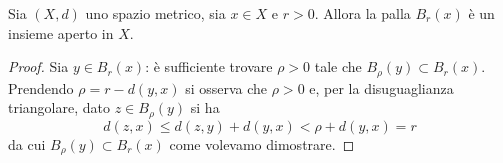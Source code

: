 \begin{theorem}
Sia $(X,d)$ uno spazio metrico, sia $x\in X$ e $r>0$. Allora la palla $B_r(x)$ è un insieme aperto in $X$.
\end{theorem}
%
\begin{proof}
Sia $y\in B_r(x)$: è sufficiente trovare $\rho>0$ tale che $B_\rho(y) \subset B_r(x)$. Prendendo $\rho = r-d(y,x)$ si osserva che $\rho >0 $ e, per la disuguaglianza triangolare,
dato $z \in B_\rho(y)$ si ha
\[
  d(z,x) \le d(z,y) + d(y,x) < \rho + d(y,x) = r
\]
da cui $B_\rho(y)\subset B_r(x)$ come volevamo dimostrare.
\end{proof}

